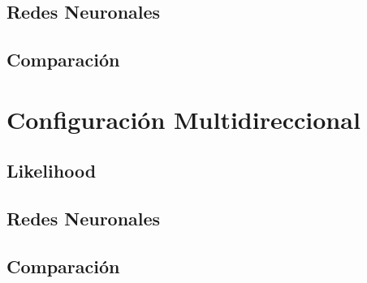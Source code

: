 \subsection{Redes Neuronales}
\subsection{Comparación}
\section{Configuración Multidireccional}
\subsection{Likelihood}
\subsection{Redes Neuronales}
\subsection{Comparación}